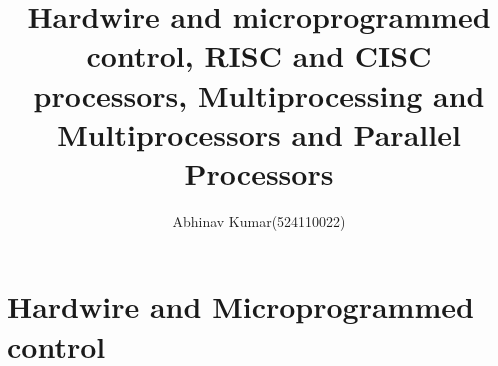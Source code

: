 \documentclass{article}
\title{Hardwire and microprogrammed control, RISC and CISC processors, Multiprocessing and Multiprocessors and Parallel Processors}
\author{Abhinav Kumar(524110022)}
\begin{document}
\maketitle
\newpage
\section{Hardwire and Microprogrammed control}
\end{document}
